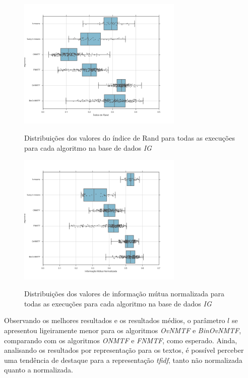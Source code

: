 \documentclass[
    12pt,                %
    oneside,            %
    a4paper,            %
    english,            %
    brazil                %
    ]{abntex2ppgsi}
\begin{document}
\begin{figure}[H]
    \centering
    \caption{Distribuições dos valores do índice de Rand para todas as execuções para cada algoritmo na base de dados \textit{IG}}
    \includegraphics[width=0.7\textwidth]{img/boxplot-all-rand-ig.png}
    \label{fig:boxplot-all-rand:ig}
\end{figure}

\begin{figure}[H]
    \centering
    \caption{Distribuições dos valores de informação mútua normalizada para todas as execuções para cada algoritmo na base de dados \textit{IG}}
    \includegraphics[width=0.7\textwidth]{img/boxplot-all-nmi-ig.png}
    \label{fig:boxplot-all-nmi:ig}
\end{figure}

Observando os melhores resultados e os resultados médios, o parâmetro $l$ se apresentou ligeiramente menor para os algoritmos \textit{OvNMTF} e \textit{BinOvNMTF}, comparando com os algoritmos \textit{ONMTF} e \textit{FNMTF}, como esperado. Ainda, analisando os resultados por representação para os textos, é possível perceber uma tendência de destaque para a representação \textit{tfidf}, tanto não normalizada quanto a normalizada.
\end{document}
